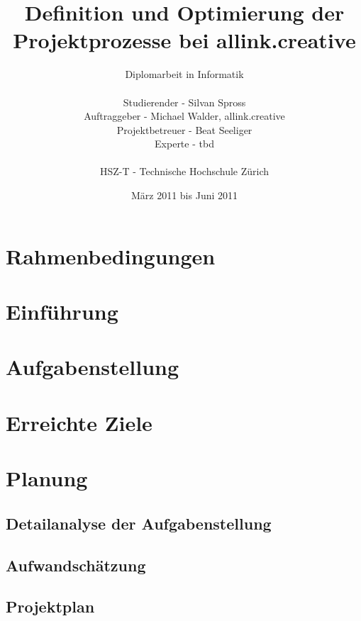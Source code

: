 \documentclass[
11pt, %
a4paper, %
BCOR25mm, %
DIV14, %
footsepline = false, %
headsepline, %
twoside, %
openright,
abstracton, %
listof=totocnumbered, %
bibliography=totocnumbered %
]{scrreprt}
\title{Definition und Optimierung der Projektprozesse bei allink.creative}
\author{Diplomarbeit in Informatik\\
    \\
    Studierender - Silvan Spross\\
	Auftraggeber - Michael Walder, allink.creative\\
    Projektbetreuer - Beat Seeliger\\
    Experte - tbd\\
	\\
	HSZ-T - Technische Hochschule Zürich}
\date{März 2011 bis Juni 2011}
\begin{document}
  \ifpdf
  \else
  \fi
  
  
  \maketitle
  \cleardoublepage

  
  \cleardoublepage

  
  \tableofcontents
  \cleardoublepage
  
  
  \chapter{Rahmenbedingungen}
  
  \cleardoublepage
  
  \chapter{Einführung}
    
  \cleardoublepage
  
  \chapter{Aufgabenstellung}
  
  \cleardoublepage
  
  \chapter{Erreichte Ziele}
  
  \cleardoublepage
  
  \chapter{Planung}
  \section{Detailanalyse der Aufgabenstellung}
  \section{Aufwandschätzung}
  \section{Projektplan}
\end{document}
